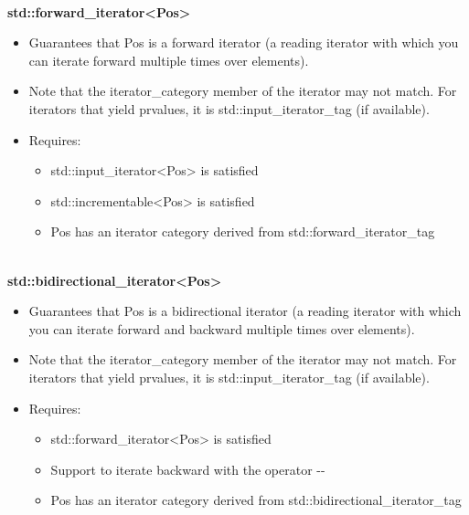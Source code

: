 \noindent
\hspace*{\fill} \\ %
\textbf{std::forward\_iterator<Pos>}

\begin{itemize}
\item
Guarantees that Pos is a forward iterator (a reading iterator with which you can iterate forward multiple times over elements).

\item
Note that the iterator\_category member of the iterator may not match. For iterators that yield prvalues, it is std::input\_iterator\_tag (if available).

\item
Requires:
\begin{itemize}
\item
std::input\_iterator<Pos> is satisfied

\item
std::incrementable<Pos> is satisfied

\item
Pos has an iterator category derived from std::forward\_iterator\_tag
\end{itemize}
\end{itemize}

\noindent
\hspace*{\fill} \\ %
\textbf{std::bidirectional\_iterator<Pos>}

\begin{itemize}
\item
Guarantees that Pos is a bidirectional iterator (a reading iterator with which you can iterate forward and backward multiple times over elements).

\item
Note that the iterator\_category member of the iterator may not match. For iterators that yield prvalues, it is std::input\_iterator\_tag (if available).

\item
Requires:
\begin{itemize}
\item
std::forward\_iterator<Pos> is satisfied

\item
Support to iterate backward with the operator -{}-

\item
Pos has an iterator category derived from std::bidirectional\_iterator\_tag
\end{itemize}
\end{itemize}

